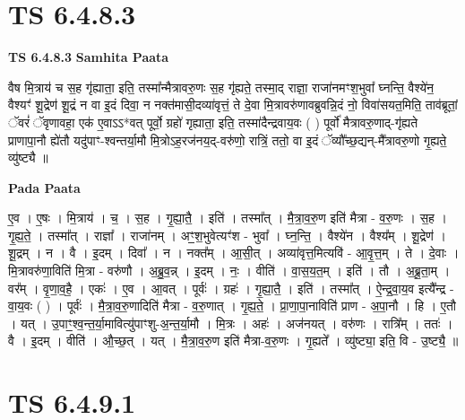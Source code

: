 \documentclass[17pt]{extarticle}
\begin{document}
\section*{ TS 6.4.8.3 }

\textbf{TS 6.4.8.3 } \newline
\textbf{Samhita Paata} \newline

वैष मि॒त्राय॑ च स॒ह गृ॑ह्याता॒ इति॒ तस्मा᳚न्मैत्रावरु॒णः स॒ह गृ॑ह्यते॒ तस्मा॒द् राज्ञा॒ राजा॑नमꣳश॒भुवा᳚ घ्नन्ति॒ वैश्ये॑न॒ वैश्यꣳ॑ शू॒द्रेण॑ शू॒द्रं न वा इ॒दं दिवा॒ न नक्त॑मासी॒दव्या॑वृत्तं॒ ते दे॒वा मि॒त्रावरु॑णावब्रुवन्नि॒दं नो॒ विवा॑सयत॒मिति॒ ताव॑ब्रूतां॒ ॅवरं॑ ॅवृणावहा॒ एक॑ ए॒वाऽऽ*वत् पूर्वो॒ ग्रहो॑ गृह्याता॒ इति॒ तस्मा॑दैन्द्रवाय॒वः ( ) पूर्वो॑ मैत्रावरु॒णाद्-गृ॑ह्यते प्राणापा॒नौ ह्ये॑तौ यदु॑पाꣳ-श्वन्तर्या॒मौ मि॒त्रोऽह॒रज॑नय॒द्-वरु॑णो॒ रात्रिं॒ ततो॒ वा इ॒दं ॅव्यौ᳚च्छ॒द्यन्-मै᳚त्रावरु॒णो गृ॒ह्यते॒ व्यु॑ष्ट्यै ॥ \newline

\textbf{Pada Paata} \newline

ए॒व । ए॒षः । मि॒त्राय॑ । च॒ । स॒ह । गृ॒ह्या॒तै॒ । इति॑ । तस्मा᳚त् । मै॒त्रा॒व॒रु॒ण इति॑ मैत्रा - व॒रु॒णः । स॒ह । गृ॒ह्य॒ते॒ । तस्मा᳚त् । राज्ञा᳚ । राजा॑नम् । अꣳ॒॒श॒भुवेत्यꣳ॑श - भुवा᳚ । घ्न॒न्ति॒ । वैश्ये॑न । वैश्य᳚म् । शू॒द्रेण॑ । शू॒द्रम् । न । वै । इ॒दम् । दिवा᳚ । न । नक्त᳚म् । आ॒सी॒त् । अव्या॑वृत्त॒मित्यवि॑ - आ॒वृ॒त्त॒म् । ते । दे॒वाः । मि॒त्रावरु॑णा॒विति॑ मि॒त्रा - वरु॑णौ । अ॒ब्रु॒व॒न्न् । इ॒दम् । नः॒ । वीति॑ । वा॒स॒य॒त॒म् । इति॑ । तौ । अ॒ब्रू॒ता॒म् । वर᳚म् । वृ॒णा॒व॒है॒ । एकः॑ । ए॒व । आ॒वत् । पूर्वः॑ । ग्रहः॑ । गृ॒ह्या॒तै॒ । इति॑ । तस्मा᳚त् । ऐ॒न्द्र॒वा॒य॒व इत्यै᳚न्द्र - वा॒य॒वः ( ) । पूर्वः॑ । मै॒त्रा॒व॒रु॒णादिति॑ मैत्रा - व॒रु॒णात् । गृ॒ह्य॒ते॒ । प्रा॒णा॒पा॒नाविति॑ प्राण - अ॒पा॒नौ । हि । ए॒तौ । यत् । उ॒पाꣳ॒॒श्व॒न्त॒र्या॒मावित्यु॑पाꣳशु-अ॒न्त॒र्या॒मौ । मि॒त्रः । अहः॑ । अज॑नयत् । वरु॑णः । रात्रि᳚म् । ततः॑ । वै । इ॒दम् । वीति॑ । औ॒च्छ॒त् । यत् । मै॒त्रा॒व॒रु॒ण इति॑ मैत्रा-व॒रु॒णः । गृ॒ह्यते᳚ । व्यु॑ष्ट्या॒ इति॒ वि - उ॒ष्ट्यै॒ ॥  \newline




\section*{ TS 6.4.9.1 }
\end{document}
